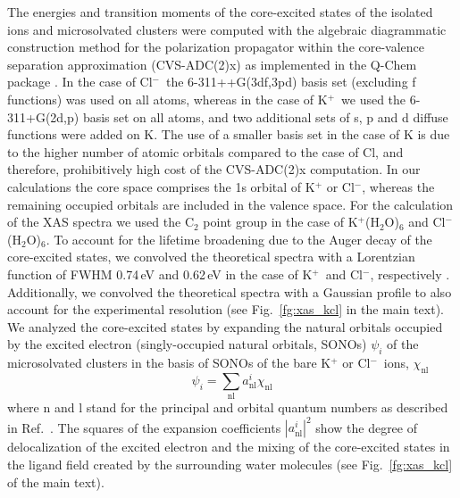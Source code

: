 \documentclass[journal=jpclcd,manuscript=letter]{achemso}
\begin{document}
The energies and transition moments of the core-excited states of the isolated ions and microsolvated clusters were computed with the algebraic diagrammatic construction method for the polarization propagator \citep{sch82:2395} within the core-valence separation approximation \citep{bar85:867,ced80:206,ced81:1038} (CVS-ADC(2)x) as implemented in the Q-Chem package \citep{Wenzel14:1900,Wenzel14:4583,Wormit14:774,QChem2015}. In the case of Cl$^{-}$~the 6-311++G(3df,3pd) basis set \citep{Krishnan80:650,McLean80:5639} (excluding f functions) was used on all atoms, whereas in the case of K$^{+}$~we used the 6-311+G(2d,p) basis set \citep{Krishnan80:650,Blaudeau97:5016} on all atoms, and two additional sets of s, p and d diffuse functions were added on K. The use of a smaller basis set in the case of K is due to the higher number of atomic orbitals compared to the case of Cl, and therefore, prohibitively high cost of the CVS-ADC(2)x computation. In our calculations the core space comprises the 1s orbital of K$^{+}$ or Cl$^{-}$, whereas the remaining occupied orbitals are included in the valence space. For the calculation of the XAS spectra we used the C$_2$ point group in the case of K$^{+}$(H$_2$O)$_6$ and Cl$^{-}$(H$_2$O)$_6$. To account for the lifetime broadening due to the Auger decay of the core-excited states, we convolved the theoretical spectra with a Lorentzian function of FWHM 0.74\,eV and 0.62\,eV in the case of K$^{+}$~and Cl$^{-}$, respectively \citep{Krause79:329}. Additionally, we convolved the theoretical spectra with a Gaussian profile to also account for the experimental resolution (see Fig.\ \ref{fg:xas_kcl} in the main text). We analyzed the core-excited states by expanding the natural orbitals occupied by the excited electron (singly-occupied natural orbitals, SONOs) $\psi_{i}$ of the microsolvated clusters in the basis of SONOs of the bare K$^{+}$ or Cl$^{-}$~ions, $\chi_{\text{nl}}$
%
\begin{equation}
\psi_{i} = \sum_{\text{nl}} a^{i}_{\text{nl}} \chi_{\text{nl}}
\end{equation}
%
where n and l stand for the principal and orbital quantum numbers as described in Ref.\ \citep{miteva16:16671}. The squares of the expansion coefficients $|a^{i}_{\text{nl}}|^{2}$ show the degree of delocalization of the excited electron and the mixing of the core-excited states in the ligand field created by the surrounding water molecules (see Fig.\ \ref{fg:xas_kcl} of the main text).
\end{document}
